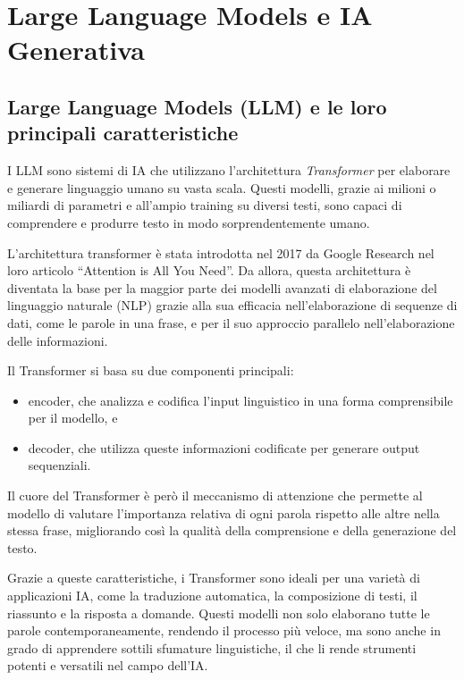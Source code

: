 \section{Large Language Models e IA Generativa}

    \subsection{Large Language Models (LLM) e le loro principali caratteristiche}
        I LLM sono sistemi di IA che utilizzano l'architettura \textit{Transformer} per elaborare e generare linguaggio umano su vasta scala. Questi modelli, grazie ai milioni o miliardi di parametri e all'ampio training su diversi testi, sono capaci di comprendere e produrre testo in modo sorprendentemente umano.
    
        L'architettura transformer è stata introdotta nel 2017 da Google Research nel loro articolo ``Attention is All You Need''. Da allora, questa architettura è diventata la base per la maggior parte dei modelli avanzati di elaborazione del linguaggio naturale (NLP) grazie alla sua efficacia nell'elaborazione di sequenze di dati, come le parole in una frase, e per il suo approccio parallelo nell'elaborazione delle informazioni.
        
        Il Transformer si basa su due componenti principali:
        \begin{itemize}
            \item encoder, che analizza e codifica l'input linguistico in una forma comprensibile per il modello, e
            \item decoder, che utilizza queste informazioni codificate per generare output sequenziali.
        \end{itemize}
            
        Il cuore del Transformer è però il meccanismo di attenzione che permette al modello di valutare l'importanza relativa di ogni parola rispetto alle altre nella stessa frase, migliorando così la qualità della comprensione e della generazione del testo.
        
        Grazie a queste caratteristiche, i Transformer sono ideali per una varietà di applicazioni IA, come la traduzione automatica, la composizione di testi, il riassunto e la risposta a domande. Questi modelli non solo elaborano tutte le parole contemporaneamente, rendendo il processo più veloce, ma sono anche in grado di apprendere sottili sfumature linguistiche, il che li rende strumenti potenti e versatili nel campo dell'IA.

